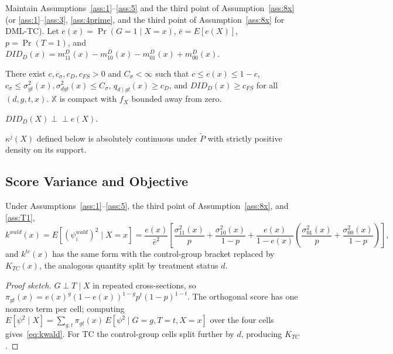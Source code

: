Maintain Assumptions~\ref{ass:1}--\ref{ass:5} and the third point of Assumption~\ref{ass:8x} (or \ref{ass:1}--\ref{ass:3}, \ref{ass:4prime}, and the third point of Assumption~\ref{ass:8x} for DML-TC). Let $e(x)=\Pr(G=1\mid X=x)$, $\bar e=E[e(X)]$, $p=\Pr(T=1)$, and $DID_D(x)=m^D_{11}(x)-m^D_{10}(x)-m^D_{01}(x)+m^D_{00}(x)$.

\begin{tassumption}\label{ass:T1}
There exist $c,c_\sigma,c_D,c_{FS}>0$ and $C_\sigma<\infty$ such that $c\le e(x)\le 1-c$, $c_\sigma\le \sigma^2_{gt}(x),\sigma^2_{dgt}(x)\le C_\sigma$, $q_{d\mid gt}(x)\ge c_D$, and $DID_D(x)\ge c_{FS}$ for all $(d,g,t,x)$. $\mathbb X$ is compact with $f_X$ bounded away from zero.
\end{tassumption}

\begin{tassumption}\label{ass:T2}
$DID_D(X)\perp\!\!\!\perp e(X)$.
\end{tassumption}

\begin{tassumption}\label{ass:T3}
$\kappa^j(X)$ defined below is absolutely continuous under $\tilde P$ with strictly positive density on its support.
\end{tassumption}

\subsection{Score Variance and Objective}

\begin{lemma}\label{lem:variance}
Under Assumptions~\ref{ass:1}--\ref{ass:5}, the third point of Assumption~\ref{ass:8x}, and \ref{ass:T1},
\begin{equation}\label{eq:kwald}
    k^{wald}(x)=E[(\psi^{wald}_i)^2\mid X=x] = \frac{e(x)}{\bar e^2}\!\left[\frac{\sigma^2_{11}(x)}{p}+\frac{\sigma^2_{10}(x)}{1-p}+\frac{e(x)}{1-e(x)}\!\left(\frac{\sigma^2_{01}(x)}{p}+\frac{\sigma^2_{00}(x)}{1-p}\right)\right],
\end{equation}
and $k^{tc}(x)$ has the same form with the control-group bracket replaced by $K_{TC}(x)$, the analogous quantity split by treatment status $d$.
\end{lemma}

\begin{proof}[Proof sketch]
$G\perp T\mid X$ in repeated cross-sections, so $\pi_{gt}(x)=e(x)^g(1-e(x))^{1-g}p^t(1-p)^{1-t}$. The orthogonal score has one nonzero term per cell; computing $E[\psi^2\mid X]=\sum_{g,t}\pi_{gt}(x)\,E[\psi^2\mid G\!=\!g,T\!=\!t,X\!=\!x]$ over the four cells gives~\eqref{eq:kwald}. For TC the control-group cells split further by $d$, producing $K_{TC}$.
\end{proof}

